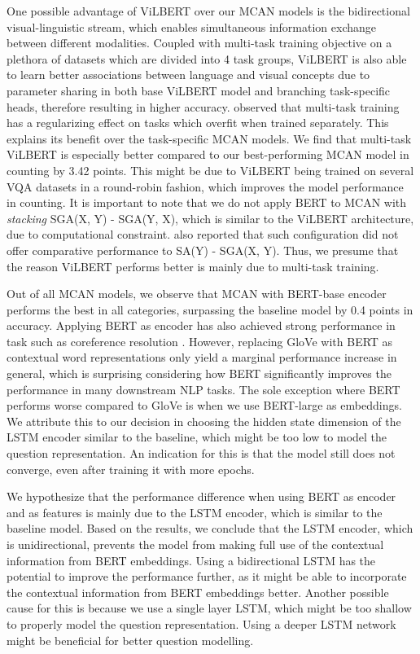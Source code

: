 \documentclass{article}
\begin{document}
One possible advantage of ViLBERT over our MCAN models is the bidirectional visual-linguistic stream, which enables simultaneous information exchange between different modalities. Coupled with multi-task training objective on a plethora of datasets which are divided into 4 task groups, ViLBERT is also able to learn better associations between language and visual concepts due to parameter sharing in both base ViLBERT model and branching task-specific heads,%
therefore resulting in higher accuracy. \citet{lu2020multitask} observed that multi-task training has a regularizing effect on tasks which overfit when trained separately. This explains its benefit over the task-specific MCAN models. We find that multi-task ViLBERT is especially better compared to our best-performing MCAN model in counting by 3.42 points. This might be due to ViLBERT being trained on several VQA datasets in a round-robin fashion, which improves the model performance in counting. It is important to note that we do not apply BERT to MCAN with \textit{stacking} SGA(X, Y) - SGA(Y, X), which is similar to the ViLBERT architecture, due to computational constraint. \citet{yu2019mcan} also reported that such configuration did not offer comparative performance to SA(Y) - SGA(X, Y). Thus, we presume that the reason ViLBERT performs better is mainly due to multi-task training.

Out of all MCAN models, we observe that MCAN with BERT-base encoder performs the best in all categories, surpassing the baseline model by 0.4 points in accuracy. Applying BERT as encoder has also achieved strong performance in task such as coreference resolution \citep{joshi-etal-2019-bert}. However, replacing GloVe with BERT as contextual word representations only yield a marginal performance increase in general, which is surprising considering how BERT significantly improves the performance in many downstream NLP tasks. The sole exception where BERT performs worse compared to GloVe is when we use BERT-large as embeddings. We attribute this to our decision in choosing the hidden state dimension of the LSTM encoder similar to the baseline, which might be too low to model the question representation. An indication for this is that the model still does not converge, even after training it with more epochs. 

We hypothesize that the performance difference when using BERT as encoder and as features is mainly due to the LSTM encoder, which is similar to the baseline model. Based on the results, we conclude that the LSTM encoder, which is unidirectional, prevents the model from making full use of the contextual information from BERT embeddings. Using a bidirectional LSTM has the potential to improve the performance further, as it might be able to incorporate the contextual information from BERT embeddings better. Another possible cause for this is because we use a single layer LSTM, which might be too shallow to properly model the question representation. Using a deeper LSTM network might be beneficial for better question modelling.
\end{document}
